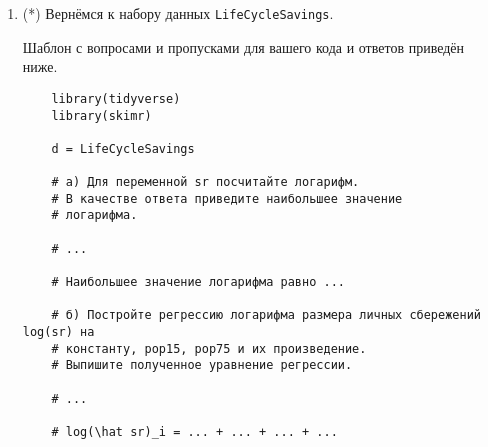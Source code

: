 \documentclass[12pt]{article}
\begin{document}
\begin{enumerate}
\begin{verbatim}
        # ...

        # В наборе данных ... наблюдений.

        # Далее работаем с полученным набором данных.
        # б) Чему равно максимальное значение переменной sr?
        # (в данных sr измерено в процентах от располагаемого дохода)

        # ...

        # Максимальное значение sr равно ... 

        # в) Постройте регрессию размера личных сбережений sr на 
        # константу, долю населения младше 15 лет pop15, 
        # долю населения старше 75 pop75.
        # Выпишите полученное уравнение регрессии. 

        # ...

        # hat_sr_i = ... + ... + ... 

        # г) Постройте 80%-й доверительный интервал для коэффициента 
        # при pop75. 

        # ...

        # Интервал: [..., ...]

        # д) Какой прогноз личных сбережений для страны 
        # с 30% населения младше 15 лет и 20% населения старше 75 лет
        # даёт данная модель?

        # ...

        # Прогноз равен ...
    \end{verbatim}

    \newpage
\item (*) Вернёмся к набору данных \verb|LifeCycleSavings|.

Шаблон с вопросами и пропусками для вашего кода и ответов приведён ниже. 

\begin{verbatim}
    library(tidyverse)
    library(skimr)

    d = LifeCycleSavings

    # а) Для переменной sr посчитайте логарифм. 
    # В качестве ответа приведите наибольшее значение 
    # логарифма.

    # ...

    # Наибольшее значение логарифма равно ... 

    # б) Постройте регрессию логарифма размера личных сбережений log(sr) на 
    # константу, pop15, pop75 и их произведение.
    # Выпишите полученное уравнение регрессии. 

    # ...

    # log(\hat sr)_i = ... + ... + ... + ...


\end{verbatim}
\end{enumerate}
\end{document}
